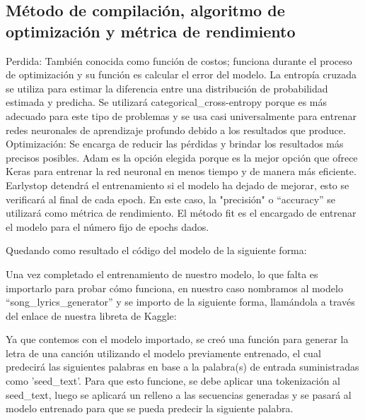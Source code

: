 \documentclass[12pt, a4paper, titlepage]{report}
\begin{document}
\subsection{Método de compilación, algoritmo de optimización y métrica de rendimiento}
Perdida: También conocida como función de costos; funciona durante el proceso de optimización y su función es calcular el error del modelo. La entropía cruzada se utiliza para estimar la diferencia entre una distribución de probabilidad estimada y predicha. Se utilizará categorical\_cross-entropy porque es más adecuado para este tipo de problemas y se usa casi universalmente para entrenar redes neuronales de aprendizaje profundo debido a los resultados que produce.
Optimización: Se encarga de reducir las pérdidas y brindar los resultados más precisos posibles. Adam es la opción elegida porque es la mejor opción que ofrece Keras para entrenar la red neuronal en menos tiempo y de manera más eficiente. Earlystop detendrá el entrenamiento si el modelo ha dejado de mejorar, esto se verificará al final de cada epoch. En este caso, la "precisión" o “accuracy” se utilizará como métrica de rendimiento.
El método fit es el encargado de entrenar el modelo para el número fijo de epochs dados.	
\begin{center}
	
\end{center}
Quedando como resultado el código del modelo de la siguiente forma:
\begin{center}
	
\end{center}
Una vez completado el entrenamiento de nuestro modelo, lo que falta es importarlo para probar cómo funciona, en nuestro caso nombramos al modelo “song\_lyrics\_generator” y se importo de la siguiente forma, llamándola a través del enlace de nuestra libreta de Kaggle:
\begin{center}
	
\end{center}
Ya que contemos con el modelo importado, se creó una función para generar la letra de una canción utilizando el modelo previamente entrenado, el cual predecirá las siguientes palabras en base a la palabra(s) de entrada suministradas como 'seed\_text'. Para que esto funcione, se debe aplicar una tokenización al seed\_text, luego se aplicará un relleno a las secuencias generadas y se pasará al modelo entrenado para que se pueda predecir la siguiente palabra.
\begin{center}
	
\end{center}	
\newpage
\end{document}
